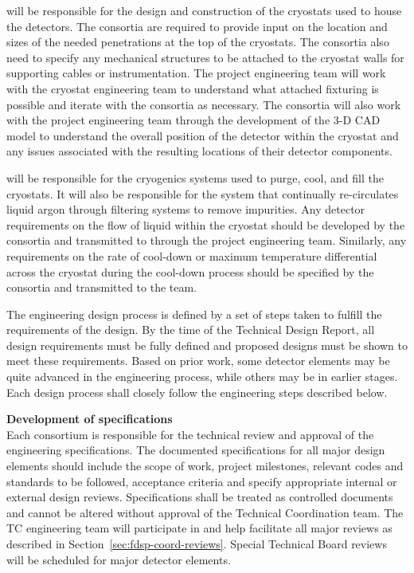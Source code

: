  will be responsible for the design and construction of the
cryostats used to house the detectors.  The consortia are required to
provide input on the location and sizes of the needed penetrations at
the top of the cryostats.  The consortia also need to specify any
mechanical structures to be attached to the cryostat walls for
supporting cables or instrumentation.  The  project engineering
team will work with the  cryostat engineering team to understand
what attached fixturing is possible and iterate with the consortia as
necessary.  The consortia will also work with the project engineering
team through the development of the 3-D CAD model to understand the
overall position of the detector within the cryostat and any issues
associated with the resulting locations of their detector components.

 will be responsible for the cryogenics systems used to purge,
cool, and fill the cryostats.  It will also be responsible for the
system that continually re-circulates liquid argon through filtering
systems to remove impurities.  Any detector requirements on the flow
of liquid within the cryostat should be developed by the consortia and
transmitted to  through the project engineering team.  Similarly,
any requirements on the rate of cool-down or maximum temperature
differential across the cryostat during the cool-down process should
be specified by the consortia and transmitted to the  team.

The engineering design process is defined by a set of steps taken to
fulfill the requirements of the design.  By the time of the Technical
Design Report, all design requirements must be fully defined and
proposed designs must be shown to meet these requirements.  Based on
prior work, some detector elements may be quite advanced in the
engineering process, while others may be in earlier stages.  Each
design process shall closely follow the engineering steps described
below.


{\bf Development of specifications}\\ Each consortium is responsible
for the technical review and approval of the engineering
specifications.  The documented specifications for all major design
elements should include the scope of work, project milestones,
relevant codes and standards to be followed, acceptance criteria and
specify appropriate internal or external design reviews.
Specifications shall be treated as controlled documents and cannot be
altered without approval of the  Technical Coordination
team.  The TC engineering team will participate in and help facilitate
all major reviews as described in
Section~\ref{sec:fdsp-coord-reviews}.  Special Technical Board reviews
will be scheduled for major detector elements.

